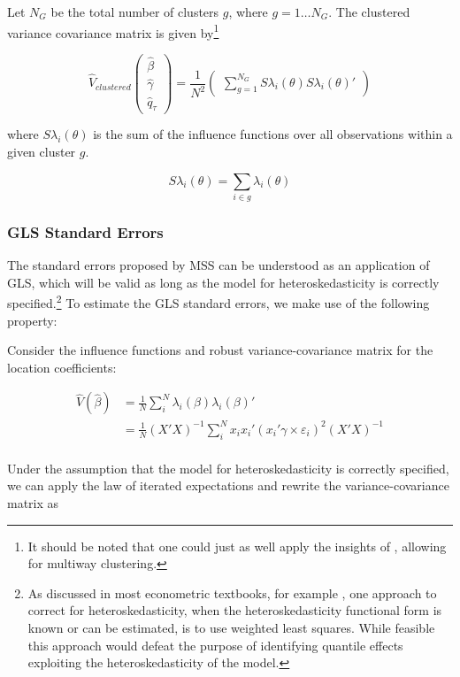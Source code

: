 \documentclass[
  authoryear,
  review,
  1p]{elsarticle}
\begin{document}
Let \(N_G\) be the total number of clusters \(g\), where
\(g=1\dots N_G\). The clustered variance covariance matrix is given
by\footnote{It should be noted that one could just as well apply the
  insights of \citet{cameron_robust_2011}, allowing for multiway
  clustering.}

\[\hat{V}_{clustered}
  \begin{pmatrix}
  \hat\beta \\
  \hat\gamma \\
  \hat q_\tau
  \end{pmatrix}
 = \frac{1}{N^2} 
 \begin{pmatrix}
 \sum_{g=1}^{N_G} S\lambda_i(\theta) S\lambda_i(\theta)'
  \end{pmatrix}
\]

where \(S\lambda_i(\theta)\) is the sum of the influence functions over
all observations within a given cluster \(g\).

\[S\lambda_i(\theta) = \sum_{i\in g} \lambda_i(\theta)
\]

\subsubsection{GLS Standard Errors}\label{sec-gls}

The standard errors proposed by MSS can be understood as an application
of GLS, which will be valid as long as the model for heteroskedasticity
is correctly specified.\footnote{As discussed in most econometric
  textbooks, for example \citet{cameron2005}, one approach to correct
  for heteroskedasticity, when the heteroskedasticity functional form is
  known or can be estimated, is to use weighted least squares. While
  feasible this approach would defeat the purpose of identifying
  quantile effects exploiting the heteroskedasticity of the model.} To
estimate the GLS standard errors, we make use of the following property:

Consider the influence functions and robust variance-covariance matrix
for the location coefficients:

\[\begin{aligned}
\hat V(\hat \beta) &= \frac{1}{N} \sum_i^N \lambda_{i}(\beta) \lambda_{i}(\beta)' \\
&= \frac{1}{N}  (X'X)^{-1}  \sum_i^N x_i x_i' ( x_i'\gamma \times \varepsilon_i)^2 (X'X)^{-1} \\
\end{aligned}
\]

Under the assumption that the model for heteroskedasticity is correctly
specified, we can apply the law of iterated expectations and rewrite the
variance-covariance matrix as
\end{document}
